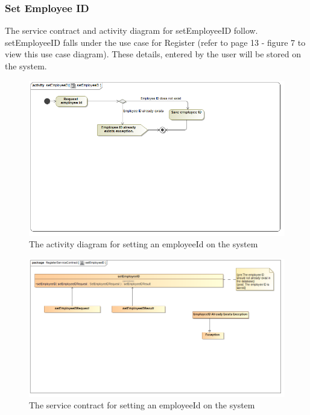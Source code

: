 \documentclass[a4paper,12pt]{report}
\begin{document}
\subsubsection{Set Employee ID }
The service contract and activity diagram for setEmployeeID follow. setEmployeeID falls under the use case for Register (refer to page 13 - figure 7 to view this use case diagram). These details, entered by the user will be stored on the system.
\begin{figure}[H]
  \centering
    \includegraphics[width=1.0\textwidth]{../Diagrams/Register/ActivityDiagrams/setEmployeeID1.png}
    \caption{The activity diagram for setting an employeeId on the system} 
\end{figure}
\begin{figure}[H]
  \centering
    \includegraphics[width=1.0\textwidth]{../Diagrams/Register/ServiceContractsRegister/setEmployeeIDServiceContract.png}
    \caption{The service contract for setting an employeeId on the system} 
\end{figure}
\end{document}
